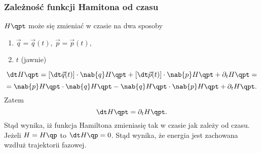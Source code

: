 \subsubsection{Zależność funkcji Hamitona od czasu}
$H\qpt$ może się zmieniać w czasie na dwa sposoby
\begin{enumerate}
	\item $\vec{q} = \vec{q}(t),\ \vec{p} = \vec{p}(t),$
	\item $t$ (jawnie)
\end{enumerate}
$$\dt H\qpt =\left[ \dt \vec{q}(t) \right]\cdot \nab{q} H\qpt +
\left[ \dt \vec{p}(t)\right] \cdot \nab{p} H\qpt + \partial_t H\qpt =
$$
$$=\nab{p}H\qpt \cdot \nab{q}H\qpt - \nab{q}H\qpt \cdot \nab{p}H\qpt + \partial_t
H\qpt.$$
Zatem
$$\dt H\qpt = \partial_t H\qpt.$$
Stąd wynika, iż funkcja Hamiltona zmieniasię tak w czasie jak zależy od czasu.\\
Jeżeli $H=H\qp$ to $\dt H\qp = 0$. Stąd wynika, że energia jest zachowana 
wzdłuż trajektorii fazowej.
